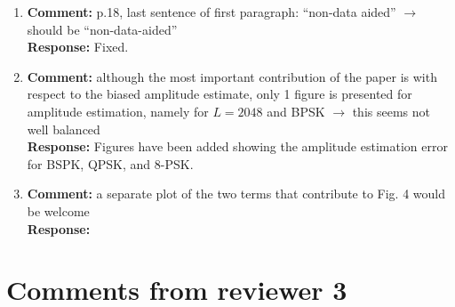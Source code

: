 \documentclass{article}
\begin{document}
\begin{enumerate}
\item \textbf{Comment:} p.18, last sentence of first paragraph: ``non-data aided'' $\to$ should be ``non-data-aided''  \\
\textbf{Response:} Fixed.

\item \textbf{Comment:}  although the most important contribution of the paper is with respect to the biased amplitude estimate, only 1 figure is presented for amplitude estimation, namely for $L=2048$ and BPSK $\to$ this seems not well balanced  \\
\textbf{Response:} Figures have been added showing the amplitude estimation error for BSPK, QPSK, and 8-PSK.

\item \textbf{Comment:}  a separate plot of the two terms that contribute to Fig. 4 would be welcome \\

\textbf{Response:}

\end{enumerate}

\section{Comments from reviewer 3}
\end{document}
